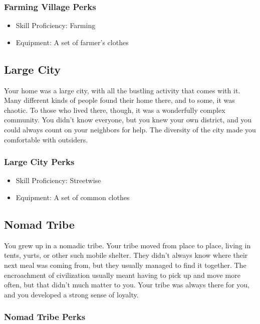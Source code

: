 \begin{multicols}{2}
\subsubsection{Farming Village Perks}

\begin{itemize}
  \item Skill Proficiency: Farming
  \item Equipment: A set of farmer's clothes
\end{itemize}

\subsection{Large City}

Your home was a large city, with all the bustling activity that comes
with it. Many different kinds of people found their home there, and
to some, it was chaotic. To those who lived there, though, it was a
wonderfully complex community. You didn't know everyone, but you knew
your own district, and you could always count on your neighbors for
help. The diversity of the city made you comfortable with outsiders.

\subsubsection{Large City Perks}

\begin{itemize}
  \item Skill Proficiency: Streetwise
  \item Equipment: A set of common clothes
\end{itemize}

\subsection{Nomad Tribe}

You grew up in a nomadic tribe. Your tribe moved from place to place,
living in tents, yurts, or other such mobile shelter. They didn't
always know where their next meal was coming from, but they usually
managed to find it together. The encroachment of civilization usually
meant having to pick up and move more often, but that didn't much
matter to you. Your tribe was always there for you, and you developed
a strong sense of loyalty.

\subsubsection{Nomad Tribe Perks}


\end{multicols}
